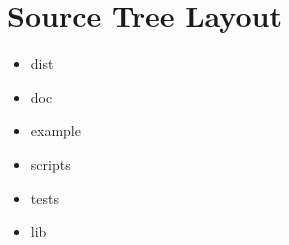 \section{Source Tree Layout}


\begin{itemize}
  \item dist
  \item doc
  \item example
  \item scripts
  \item tests
\end{itemize}


\begin{itemize}
  \item lib
\end{itemize}






